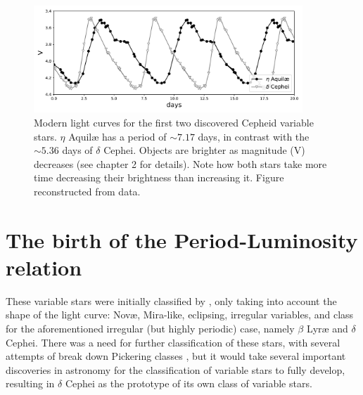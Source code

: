 \begin{figure}[H] 
	\centering
	\includegraphics[width=0.9\textwidth]{img/eta_aquilae_delta_cephei_light_curves.pdf}
	\caption[Light curve of $\delta$ Cephei and $\eta$ Aquilæ]{Modern light curves for the first two discovered Cepheid variable stars. 
	$\eta$ Aquil\ae{} has a period of $\sim7.17$ days, in contrast with the $\sim5.36$ days of $\delta$ Cephei.
	Objects are brighter as magnitude (V) decreases (see chapter 2 for details). 
	Note how both stars take more time decreasing their brightness than increasing it. 
	Figure reconstructed from \cite{Kiss1998} data.}
	\label{fig:first-cepheids}
\end{figure}

\section{The birth of the Period-Luminosity relation}


These variable stars were initially classified by \cite{Pickering1880}, only taking into account the shape of the light curve: 
Nov\ae{}, Mira-like, eclipsing, irregular variables, and class for the aforementioned irregular (but highly periodic) case, namely $\beta$ Lyr\ae{} and $\delta$ Cephei.
There was a need for further classification of these stars, with several attempts of break down Pickering classes \citep{Lockyer1896,Lockyer1897}, 
but it would take several important discoveries in astronomy for the classification of variable stars to fully develop,
resulting in $\delta$ Cephei as the prototype of its own class of variable stars.


